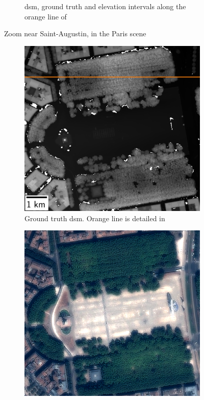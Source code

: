 \begin{figure}
\begin{subfigure}[t]{\linewidth}
        \caption{\acrshort{dsm}, ground truth and elevation intervals along the orange line of }
        \label{fig:paris_error_tree_line}
    \end{subfigure}
    \caption{Zoom near Saint-Augustin, in the Paris scene}
    \label{fig:paris_error_tree}
\end{figure}

\begin{figure}
    \begin{subfigure}[t]{0.33\linewidth}
        \flushleft
        \includegraphics[width=\linewidth]{Images/Chap_6/Bordeaux_gt_zoom.png}
        \caption{Ground truth \acrshort{dsm}. Orange line is detailed in }
        \label{fig:Bordeaux_gt}
    \end{subfigure}\hfill
    \begin{subfigure}[t]{0.33\linewidth}
        \centering
        \includegraphics[width=\linewidth]{Images/Chap_6/Bordeaux_clr_zoom.png}

\end{subfigure}
\end{figure}
